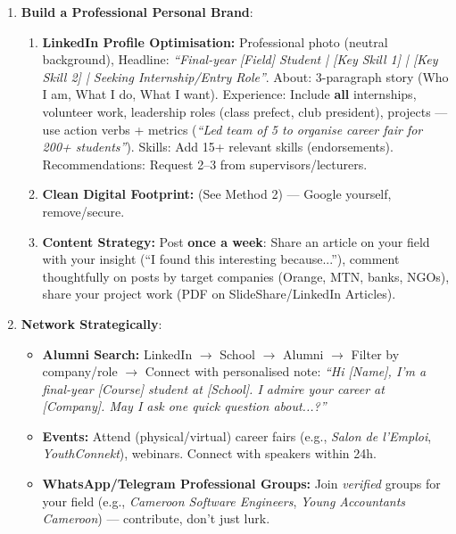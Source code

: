 \documentclass[11pt]{article}
\begin{document}
\begin{methode}
\begin{enumerate}
    \item \textbf{Build a Professional Personal Brand}:
          \begin{enumerate}
              \item \textbf{LinkedIn Profile Optimisation:} Professional photo (neutral background), Headline: \textit{``Final-year [Field] Student | [Key Skill 1] | [Key Skill 2] | Seeking Internship/Entry Role''}. About: 3-paragraph story (Who I am, What I do, What I want). Experience: Include \textbf{all} internships, volunteer work, leadership roles (class prefect, club president), projects — use action verbs + metrics (\textit{``Led team of 5 to organise career fair for 200+ students''}). Skills: Add 15+ relevant skills (endorsements). Recommendations: Request 2–3 from supervisors/lecturers.
              \item \textbf{Clean Digital Footprint:} (See Method 2) — Google yourself, remove/secure.
              \item \textbf{Content Strategy:} Post \textbf{once a week}: Share an article on your field with your insight (``I found this interesting because...''), comment thoughtfully on posts by target companies (Orange, MTN, banks, NGOs), share your project work (PDF on SlideShare/LinkedIn Articles).
          \end{enumerate}
    \item \textbf{Network Strategically}:
          \begin{itemize}
              \item \textbf{Alumni Search:} LinkedIn $\rightarrow$ School $\rightarrow$ Alumni $\rightarrow$ Filter by company/role $\rightarrow$ Connect with personalised note: \textit{``Hi [Name], I'm a final-year [Course] student at [School]. I admire your career at [Company]. May I ask one quick question about...?''}
              \item \textbf{Events:} Attend (physical/virtual) career fairs (e.g., \textit{Salon de l'Emploi}, \textit{YouthConnekt}), webinars. Connect with speakers within 24h.
              \item \textbf{WhatsApp/Telegram Professional Groups:} Join \textit{verified} groups for your field (e.g., \textit{Cameroon Software Engineers}, \textit{Young Accountants Cameroon}) — contribute, don't just lurk.
          \end{itemize}

\end{enumerate}
\end{methode}
\end{document}
